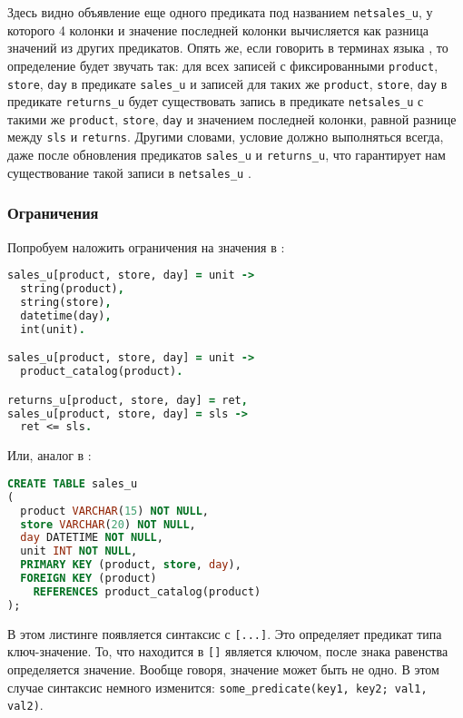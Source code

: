Здесь видно объявление еще одного предиката под названием \lstinline{netsales_u}, у которого 4 колонки и значение последней колонки вычисляется как разница значений из других предикатов. Опять же, если говорить в терминах языка \logiql, то определение будет звучать так: для всех записей с фиксированными \lstinline{product}, \lstinline{store}, \lstinline{day} в предикате \lstinline{sales_u} и записей для таких же \lstinline{product}, \lstinline{store}, \lstinline{day} в предикате \lstinline{returns_u} будет существовать запись в предикате \lstinline{netsales_u} с такими же \lstinline{product}, \lstinline{store}, \lstinline{day} и значением последней колонки, равной разнице между \lstinline{sls} и \lstinline{returns}. Другими словами, условие должно выполняться всегда, даже после обновления предикатов \lstinline{sales_u} и \lstinline{returns_u}, что гарантирует нам существование такой записи в \lstinline{netsales_u} \cite{query_language_for_smart_db}.

\subsubsection{Ограничения}
\label{sec:technology:logiql:constraints}

Попробуем наложить ограничения на значения в \logiql:

\begin{lstlisting}[language=Prolog]
sales_u[product, store, day] = unit ->
  string(product),
  string(store),
  datetime(day),
  int(unit).

sales_u[product, store, day] = unit ->
  product_catalog(product).

returns_u[product, store, day] = ret,
sales_u[product, store, day] = sls ->
  ret <= sls.
\end{lstlisting}

Или, аналог в \sql:

\begin{lstlisting}[language=SQL]
CREATE TABLE sales_u
(
  product VARCHAR(15) NOT NULL,
  store VARCHAR(20) NOT NULL,
  day DATETIME NOT NULL,
  unit INT NOT NULL,
  PRIMARY KEY (product, store, day),
  FOREIGN KEY (product)
    REFERENCES product_catalog(product)
);
\end{lstlisting}

В этом листинге появляется синтаксис с \lstinline{[...]}. Это определяет предикат типа ключ-значение. То, что находится в \lstinline{[]} является ключом, после знака равенства определяется значение. Вообще говоря, значение может быть не одно. В этом случае синтаксис немного изменится: \lstinline{some_predicate(key1, key2; val1, val2)}.


